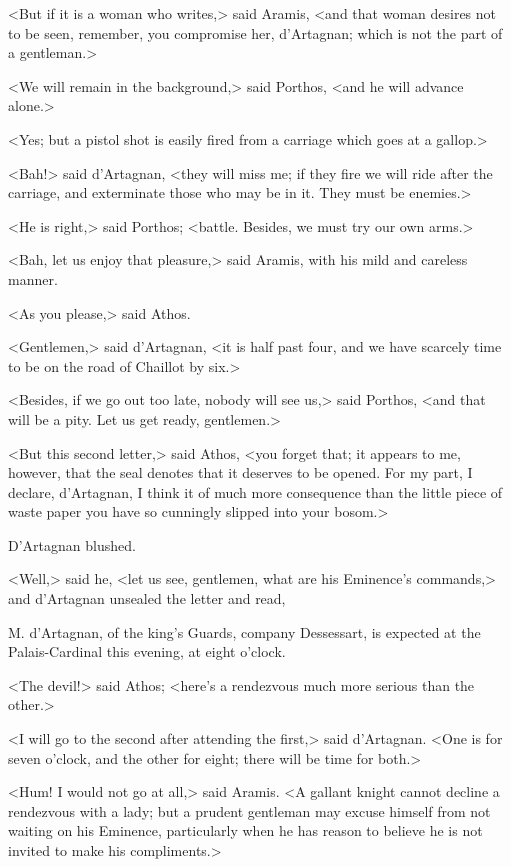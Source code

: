 <But if it is a woman who writes,> said Aramis, <and that woman desires not to be seen, remember, you compromise her, d'Artagnan; which is not the part of a gentleman.> 

<We will remain in the background,> said Porthos, <and he will advance alone.> 

<Yes; but a pistol shot is easily fired from a carriage which goes at a gallop.> 

<Bah!> said d'Artagnan, <they will miss me; if they fire we will ride after the carriage, and exterminate those who may be in it. They must be enemies.> 

<He is right,> said Porthos; <battle. Besides, we must try our own arms.> 

<Bah, let us enjoy that pleasure,> said Aramis, with his mild and careless manner. 

<As you please,> said Athos. 

<Gentlemen,> said d'Artagnan, <it is half past four, and we have scarcely time to be on the road of Chaillot by six.> 

<Besides, if we go out too late, nobody will see us,> said Porthos, <and that will be a pity. Let us get ready, gentlemen.> 

<But this second letter,> said Athos, <you forget that; it appears to me, however, that the seal denotes that it deserves to be opened. For my part, I declare, d'Artagnan, I think it of much more consequence than the little piece of waste paper you have so cunningly slipped into your bosom.> 

D'Artagnan blushed. 

<Well,> said he, <let us see, gentlemen, what are his Eminence's commands,> and d'Artagnan unsealed the letter and read, 
\begin{mail}{}{}
M. d'Artagnan, of the king's Guards, company Dessessart, is expected at the Palais-Cardinal this evening, at eight o'clock. 
\end{mail}

<The devil!> said Athos; <here's a rendezvous much more serious than the other.> 

<I will go to the second after attending the first,> said d'Artagnan. <One is for seven o'clock, and the other for eight; there will be time for both.> 

<Hum! I would not go at all,> said Aramis. <A gallant knight cannot decline a rendezvous with a lady; but a prudent gentleman may excuse himself from not waiting on his Eminence, particularly when he has reason to believe he is not invited to make his compliments.> 

